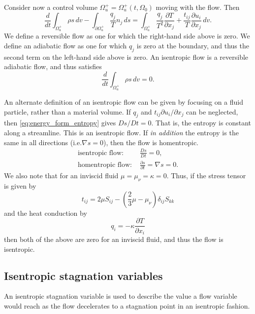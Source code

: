\documentclass[oneside,a4paper,11pt]{report}
\begin{document}
Consider now a control volume $\Omega^+_u=\Omega^+_u(t,\Omega_0)$ moving with the flow. Then
\begin{equation}
    \frac{d}{dt} \int_{\Omega^+_u} \rho s \, dv - \int_{\partial \Omega^+_u} \frac{q_j}{T} n_j \,ds = \int_{\Omega^+_u} \frac{q_j}{T^2}\frac{\partial T}{\partial x_j} + \frac{t_{ij}}{T} \frac{\partial u_i}{\partial x_j} \, dv.
\end{equation}
We define a reversible flow as one for which the right-hand side above is zero. We define an adiabatic flow as one for which $q_j$ is zero at the boundary, and thus the second term on the left-hand side above is zero. An isentropic flow is a reversible adiabatic flow, and thus satisfies
\begin{equation}
    \frac{d}{dt} \int_{\Omega^+_u} \rho s \, dv = 0.
\end{equation}

An alternate definition of an isentropic flow can be given by focusing on a fluid particle, rather than a material volume. If $q_j$ and $t_{ij} \partial u_i / \partial x_j$ can be neglected, then \cref{eq:energy_form_entropy} gives $Ds/Dt = 0$. That is, the entropy is constant along a streamline. This is an isentropic flow. If \textit{in addition} the entropy is the same in all directions (i.e.\@ $\nabla s = 0$), then the flow is homentropic. 
\begin{align}
    \text{isentropic flow:   }& \frac{Ds}{Dt} = 0, \\
    \text{homentropic flow:   }& \frac{\partial s}{\partial t} = \nabla s = 0.
\end{align}
We also note that for an inviscid fluid $\mu = \mu_\nu = \kappa = 0$. Thus, if the stress tensor is given by
\begin{equation}
    t_{ij} = 2 \mu S_{ij} - \left( \frac{2}{3} \mu - \mu_\nu \right) \delta_{ij} S_{kk}
\end{equation}
and the heat conduction by
\begin{equation}
    q_i = -\kappa \frac{\partial T}{\partial x_i}
\end{equation}
then both of the above are zero for an inviscid fluid, and thus the flow is isentropic.

\subsection{Isentropic stagnation variables}
An isentropic stagnation variable is used to describe the value a flow variable would reach as the flow decelerates to a stagnation point in an isentropic fashion.
\end{document}
